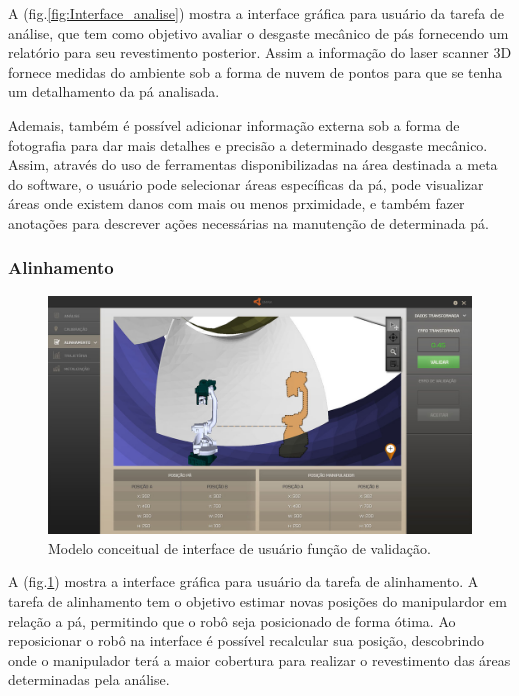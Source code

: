 \documentclass[12pt,a4paper]{article}
\begin{document}
A (fig.\ref{fig:Interface_analise}) mostra a interface gráfica para usuário da
tarefa de análise, que tem como objetivo avaliar o desgaste mecânico de pás
fornecendo um relatório para seu revestimento posterior. Assim a informação do laser scanner 3D
fornece medidas do ambiente sob a forma de nuvem de pontos para que se tenha um
detalhamento da pá analisada. 

Ademais, também é possível adicionar informação externa sob a forma de
fotografia para dar mais detalhes e precisão a determinado desgaste mecânico.
Assim, através do uso de ferramentas disponibilizadas na área destinada a meta
do software, o usuário pode selecionar áreas específicas da pá, pode visualizar
áreas onde existem danos com mais ou menos prximidade, e também fazer
anotações para descrever ações necessárias na manutenção de determinada pá. 

\subsubsection {Alinhamento}

\begin{figure}[H]
\begin{center}
  \includegraphics[width=.95\columnwidth]{figs/Validacao.jpg}
  \caption{Modelo conceitual de interface de usuário função de validação.}
  \label{fig:Interface_validacao}
\end{center}
\end{figure} 

A (fig.\ref{fig:Interface_validacao}) mostra a interface gráfica para usuário
da tarefa de alinhamento. A tarefa de alinhamento tem o objetivo estimar
novas posições do manipulardor em relação a pá, permitindo que o robô
seja posicionado de forma ótima. Ao reposicionar o robô na interface é possível
recalcular sua posição, descobrindo onde o manipulador terá a maior cobertura
para realizar o revestimento das áreas determinadas pela análise.
\end{document}
